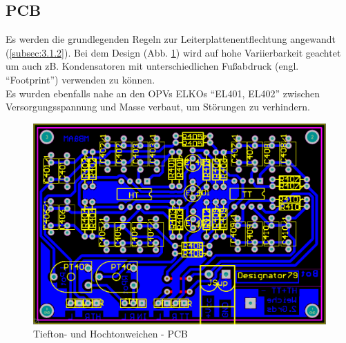 \newpage
\subsection{PCB}\label{subsec:4.3.3}
Es werden die grundlegenden Regeln zur Leiterplattenentflechtung angewandt (\ref{subsec:3.1.2}).
Bei dem Design (Abb. \ref{fig:4.3.3.1}) wird auf hohe Variierbarkeit geachtet um auch zB. Kondensatoren mit unterschiedlichen Fußabdruck (engl. \enquote{Footprint}) verwenden zu können.\\
Es wurden ebenfalls nahe an den OPVs ELKOs \enquote{EL401, EL402} zwischen Versorgungsspannung und Masse verbaut, um Störungen zu verhindern.
\begin{figure} [H]
	\centering	
	\includegraphics[width=1\textwidth]{img/Print4/4_TTuHTWeiche-PCB.PNG}
	\caption{Tiefton- und Hochtonweichen - PCB}
	\label {fig:4.3.3.1}
\end{figure}



